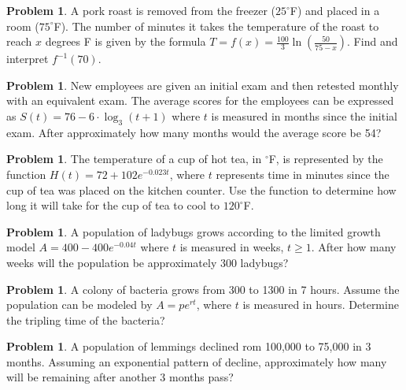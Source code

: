 \documentclass[18pt]{scrartcl}
\theoremstyle{definition}
\newtheorem{problem}[theorem]{Problem}
\begin{document}
%
%
%
%

\begin{problem}
	A pork roast is removed from the freezer ($25^\circ$F) and placed in a room ($75^\circ$F). The number of minutes it takes the temperature of the roast to reach $x$ degrees F is given by the formula $T=f(x)=\frac{100}{3}\ln\left(\frac{50}{75-x}\right)$. Find and interpret $f^{-1}(70)$.
\end{problem}

\begin{problem}
	New employees are given an initial exam and then retested monthly with an equivalent exam. The average scores for the employees can be expressed as $S(t)=76-6\cdot \log_{3}(t+1)$ where $t$ is measured in months since the initial exam. After approximately how many months would the average score be 54?
\end{problem}

\begin{problem}
	The temperature of a cup of hot tea, in $^\circ$F, is represented by the function $H(t)=72+102e^{-0.023t}$, where $t$ represents time in minutes since the cup of tea was placed on the kitchen counter. Use the function to determine how long it will take for the cup of tea to cool to $120^\circ$F. 
\end{problem}

\begin{problem}
	A population of ladybugs grows according to the limited growth model $A=400-400e^{-0.04t}$ where $t$ is measured in weeks, $t \geq 1$. After how many weeks will the population be approximately 300 ladybugs?
\end{problem}

\begin{problem}
	A colony of bacteria grows from 300 to 1300 in 7 hours. Assume the population can be modeled by $A=pe^{rt}$, where $t$ is measured in hours. Determine the tripling time of the bacteria?
\end{problem}

\begin{problem}
	A population of lemmings declined rom 100,000 to 75,000 in 3 months. Assuming an exponential pattern of decline, approximately how many will be remaining after another 3 months pass?
\end{problem}
\end{document}
